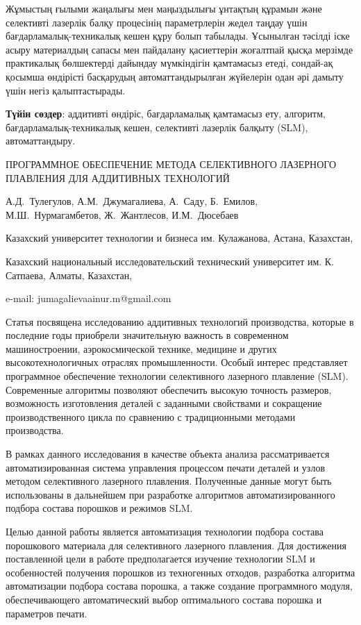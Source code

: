 Жұмыстың ғылыми жаңалығы мен маңыздылығы ұнтақтың құрамын және
селективті лазерлік балқу процесінің параметрлерін жедел таңдау үшін
бағдарламалық-техникалық кешен құру болып табылады. Ұсынылған тәсілді
іске асыру материалдың сапасы мен пайдалану қасиеттерін жоғалтпай қысқа
мерзімде практикалық бөлшектерді дайындау мүмкіндігін қамтамасыз етеді,
сондай-ақ қосымша өндірісті басқарудың автоматтандырылған жүйелерін одан
әрі дамыту үшін негіз қалыптастырады.

{\bfseries Түйін сөздер}: аддитивті өндіріс, бағдарламалық қамтамасыз ету,
алгоритм, бағдарламалық-тех\-никалық кешен, селективті лазерлік балқыту
(SLM), автоматтандыру.

\begin{header}
ПРОГРАММНОЕ ОБЕСПЕЧЕНИЕ МЕТОДА СЕЛЕКТИВНОГО ЛАЗЕРНОГО ПЛАВЛЕНИЯ ДЛЯ АДДИТИВНЫХ ТЕХНОЛОГИЙ

А.Д.~Тулегулов,
А.М.~Джумагалиева\envelope,
А.~Саду,
Б.~Емилов,
М.Ш.~Нурмагамбетов,
Ж.~Жантлесов,
И.М.~Дюсебаев
\end{header}

\begin{affil}
Казахский университет технологии и бизнеса им. Кулажанова, Астана, Казахстан,

Казахский национальный исследовательский технический университет им. К. Сатпаева, Алматы, Казахстан,

e-mail: jumagalievaainur.m@gmail.com
\end{affil}

Статья посвящена исследованию аддитивных технологий производства,
которые в последние годы приобрели значительную важность в современном
машиностроении, аэрокосмической технике, медицине и других
высокотехнологичных отраслях промышленности. Особый интерес представляет
программное обеспечение технологии селективного лазерного плавление
(SLM). Современные алгоритмы позволяют обеспечить высокую точность
размеров, возможность изготовления деталей с заданными свойствами и
сокращение производственного цикла по сравнению с традиционными методами
производства.

В рамках данного исследования в качестве объекта анализа рассматривается
автоматизированная система управления процессом печати деталей и узлов
методом селективного лазерного плавления. Полученные данные могут быть
использованы в дальнейшем при разработке алгоритмов автоматизированного
подбора состава порошков и режимов SLM.

Целью данной работы является автоматизация технологии подбора состава
порошкового материала для селективного лазерного плавления. Для
достижения поставленной цели в работе предполагается изучение технологии
SLM и особенностей получения порошков из техногенных отходов, разработка
алгоритма автоматизации подбора состава порошка, а также создание
программного модуля, обеспечивающего автоматический выбор оптимального
состава порошка и параметров печати.

